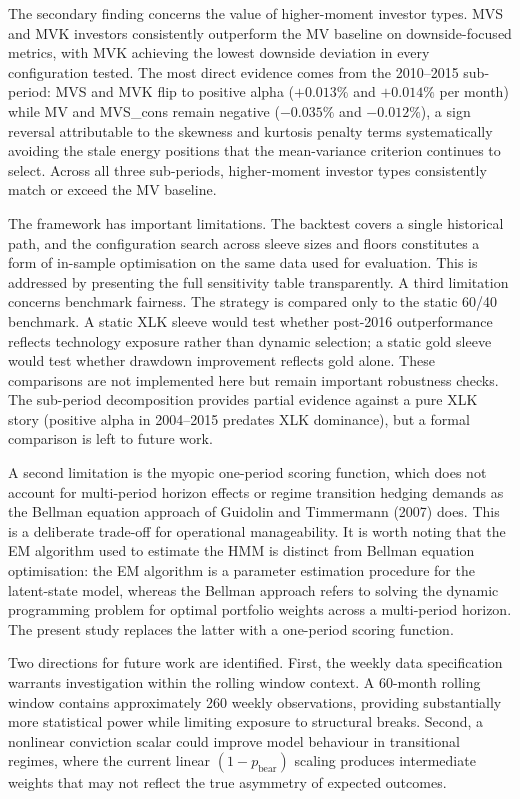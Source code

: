 \documentclass[12pt, a4paper]{article}
\begin{document}
The secondary finding concerns the value of higher-moment investor types. MVS and MVK
investors consistently outperform the MV baseline on downside-focused metrics, with MVK
achieving the lowest downside deviation in every configuration tested. The most direct
evidence comes from the 2010--2015 sub-period: MVS and MVK flip to positive alpha
($+0.013\%$ and $+0.014\%$ per month) while MV and MVS\_cons remain negative
($-0.035\%$ and $-0.012\%$), a sign reversal attributable to the skewness and kurtosis
penalty terms systematically avoiding the stale energy positions that the mean-variance
criterion continues to select. Across all three sub-periods, higher-moment investor types
consistently match or exceed the MV baseline.

The framework has important limitations. The backtest covers a single historical path, and
the configuration search across sleeve sizes and floors constitutes a form of in-sample
optimisation on the same data used for evaluation. This is addressed by presenting the full
sensitivity table transparently. A third limitation concerns benchmark fairness. The strategy is compared only to the
static 60/40 benchmark. A static XLK sleeve would test whether post-2016 outperformance
reflects technology exposure rather than dynamic selection; a static gold sleeve would test
whether drawdown improvement reflects gold alone. These comparisons are not implemented here
but remain important robustness checks. The sub-period decomposition provides partial
evidence against a pure XLK story (positive alpha in 2004--2015 predates XLK dominance),
but a formal comparison is left to future work.

A second limitation is the myopic one-period scoring
function, which does not account for multi-period horizon effects or regime transition
hedging demands as the Bellman equation approach of Guidolin and Timmermann (2007) does.
This is a deliberate trade-off for operational manageability. It is worth noting that the EM algorithm used to estimate the HMM is distinct from Bellman equation optimisation: the EM algorithm is a parameter estimation procedure for the latent-state model, whereas the Bellman approach refers to solving the dynamic programming problem for optimal portfolio weights across a multi-period horizon. The present study replaces the latter with a one-period scoring function.

Two directions for future work are identified. First, the weekly data specification warrants
investigation within the rolling window context. A 60-month rolling window contains
approximately 260 weekly observations, providing substantially more statistical power while
limiting exposure to structural breaks. Second, a nonlinear conviction scalar could improve
model behaviour in transitional regimes, where the current linear $(1 - p_{\text{bear}})$
scaling produces intermediate weights that may not reflect the true asymmetry of expected
outcomes.
\end{document}
